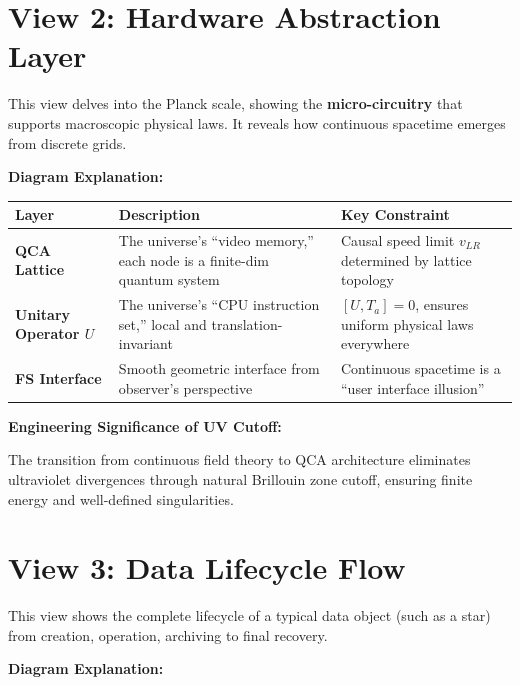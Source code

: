 \documentclass[11pt,a4paper,twoside]{book}
\begin{document}
\section{View 2: Hardware Abstraction Layer}

This view delves into the Planck scale, showing the \textbf{micro-circuitry} that supports macroscopic physical laws. It reveals how continuous spacetime emerges from discrete grids.

\textbf{Diagram Explanation:}

\begin{table}[h]
\centering
\begin{tabular}{|l|l|l|}
\hline
\textbf{Layer} & \textbf{Description} & \textbf{Key Constraint} \\
\hline
\textbf{QCA Lattice} & The universe's ``video memory,'' each node is a finite-dim quantum system & Causal speed limit $v_{LR}$ determined by lattice topology \\
\hline
\textbf{Unitary Operator $U$} & The universe's ``CPU instruction set,'' local and translation-invariant & $[U, T_a] = 0$, ensures uniform physical laws everywhere \\
\hline
\textbf{FS Interface} & Smooth geometric interface from observer's perspective & Continuous spacetime is a ``user interface illusion'' \\
\hline
\end{tabular}
\end{table}

\textbf{Engineering Significance of UV Cutoff:}

The transition from continuous field theory to QCA architecture eliminates ultraviolet divergences through natural Brillouin zone cutoff, ensuring finite energy and well-defined singularities.

\section{View 3: Data Lifecycle Flow}

This view shows the complete lifecycle of a typical data object (such as a star) from creation, operation, archiving to final recovery.

\textbf{Diagram Explanation:}
\end{document}
